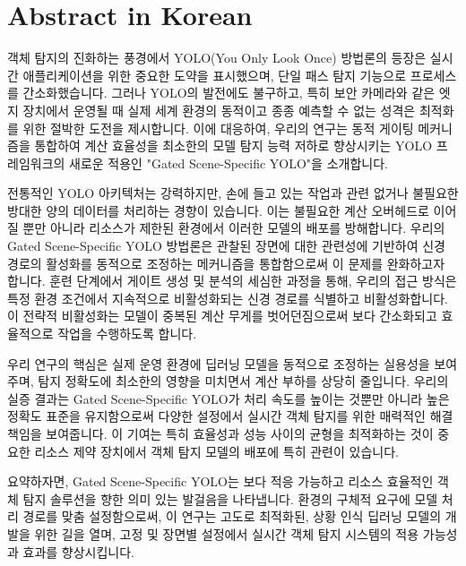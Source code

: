 \section*{Abstract in Korean} 						%

객체 탐지의 진화하는 풍경에서 YOLO(You Only Look Once) 방법론의 등장은 실시간 애플리케이션을 위한 중요한 도약을 표시했으며, 단일 패스 탐지 기능으로 프로세스를 간소화했습니다. 그러나 YOLO의 발전에도 불구하고, 특히 보안 카메라와 같은 엣지 장치에서 운영될 때 실제 세계 환경의 동적이고 종종 예측할 수 없는 성격은 최적화를 위한 절박한 도전을 제시합니다. 이에 대응하여, 우리의 연구는 동적 게이팅 메커니즘을 통합하여 계산 효율성을 최소한의 모델 탐지 능력 저하로 향상시키는 YOLO 프레임워크의 새로운 적용인 "Gated Scene-Specific YOLO"을 소개합니다.

전통적인 YOLO 아키텍처는 강력하지만, 손에 들고 있는 작업과 관련 없거나 불필요한 방대한 양의 데이터를 처리하는 경향이 있습니다. 이는 불필요한 계산 오버헤드로 이어질 뿐만 아니라 리소스가 제한된 환경에서 이러한 모델의 배포를 방해합니다. 우리의 Gated Scene-Specific YOLO 방법론은 관찰된 장면에 대한 관련성에 기반하여 신경 경로의 활성화를 동적으로 조정하는 메커니즘을 통합함으로써 이 문제를 완화하고자 합니다. 훈련 단계에서 게이트 생성 및 분석의 세심한 과정을 통해, 우리의 접근 방식은 특정 환경 조건에서 지속적으로 비활성화되는 신경 경로를 식별하고 비활성화합니다. 이 전략적 비활성화는 모델이 중복된 계산 무게를 벗어던짐으로써 보다 간소화되고 효율적으로 작업을 수행하도록 합니다.

우리 연구의 핵심은 실제 운영 환경에 딥러닝 모델을 동적으로 조정하는 실용성을 보여주며, 탐지 정확도에 최소한의 영향을 미치면서 계산 부하를 상당히 줄입니다. 우리의 실증 결과는 Gated Scene-Specific YOLO가 처리 속도를 높이는 것뿐만 아니라 높은 정확도 표준을 유지함으로써 다양한 설정에서 실시간 객체 탐지를 위한 매력적인 해결책임을 보여줍니다. 이 기여는 특히 효율성과 성능 사이의 균형을 최적화하는 것이 중요한 리소스 제약 장치에서 객체 탐지 모델의 배포에 특히 관련이 있습니다.

요약하자면, Gated Scene-Specific YOLO는 보다 적응 가능하고 리소스 효율적인 객체 탐지 솔루션을 향한 의미 있는 발걸음을 나타냅니다. 환경의 구체적 요구에 모델 처리 경로를 맞춤 설정함으로써, 이 연구는 고도로 최적화된, 상황 인식 딥러닝 모델의 개발을 위한 길을 열며, 고정 및 장면별 설정에서 실시간 객체 탐지 시스템의 적용 가능성과 효과를 향상시킵니다.

\clearpage